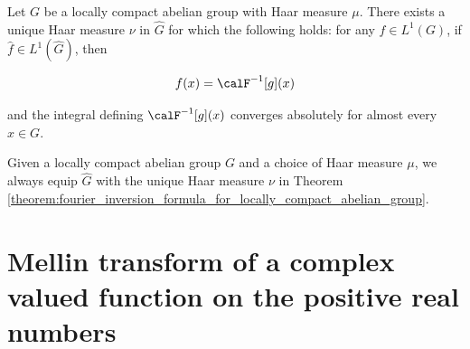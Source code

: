 

\begin{theorem} \label{theorem:fourier_inversion_formula_for_locally_compact_abelian_group}
    Let \(G\) be a locally compact abelian group with Haar measure \(\mu\). There exists a unique Haar measure $\nu$ in $\widehat{G}$ for which the following holds: for any \(f \in L^1(G)\), if \(\hat{f} \in L^1(\widehat{G})\), then 
    
    $$f(x) = \calF^{-1}[g](x)$$

    and the integral defining $\calF^{-1}[g](x)$ converges absolutely for almost every \(x \in G\).
\end{theorem}

\begin{convention} \label{convention:haar_measure_on_pontryagin_dual_of_a_locally_compact_abelian_group}
    Given a locally compact abelian group $G$ and a choice of Haar measure $\mu$, we always equip $\widehat{G}$ with the unique Haar measure $\nu$ in Theorem \ref{theorem:fourier_inversion_formula_for_locally_compact_abelian_group}.
\end{convention}


\section{Mellin transform of a complex valued function on the positive real numbers}




